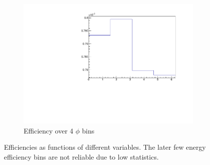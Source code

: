 \documentclass[12pt]{article}
\numberwithin{equation}{section}
\numberwithin{figure}{section}
\begin{document}
\begin{figure}
\begin{subfigure}{0.4\textwidth}
                \includegraphics[scale=0.5,trim={4cm 0 0 0}]{Efficiency_phi}
                \caption{Efficiency over 4 $\phi$ bins}
                \label{fig:eff_phi}
    \end{subfigure}
	\caption{Efficiencies as functions of different variables. The later few energy efficiency bins are not reliable due to low statistics.}
	\label{fig:effieciency}
\end{figure}
%
\end{document}
